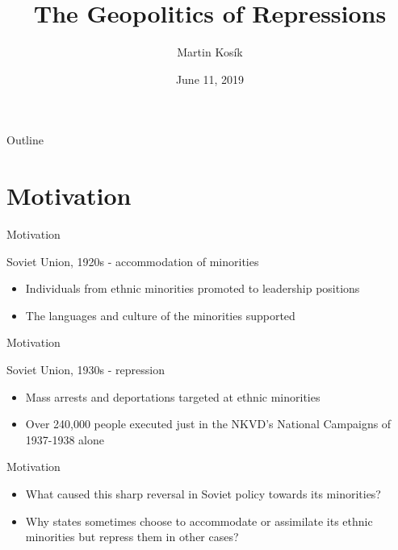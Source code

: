 \documentclass[11pt]{beamer}
\title{The Geopolitics of Repressions}
\date{June 11, 2019}
\author{Martin Kosík}
\institute{Charles University}
\begin{document}
\begin{frame}
\titlepage
\end{frame}
\begin{frame}{Outline}
\tableofcontents
\end{frame}


\section{Motivation}
\begin{frame}{Motivation}
 \begin{block}{Soviet Union, 1920s -  accommodation of minorities}  {
\begin{itemize}
    \item Individuals from ethnic minorities  promoted to leadership positions 
    \item  The languages and culture of the minorities supported \citep{martin_affirmative_2001}
\end{itemize}}
\end{block} 
\end{frame}

\begin{frame}{Motivation}
 \begin{block}{Soviet Union, 1930s - repression}  {
\begin{itemize}
    \item Mass arrests and deportations targeted at ethnic minorities
    \item  Over 240,000 people executed just in the NKVD's National Campaigns of 1937-1938 alone \citep[p. 855]{martin_origins_1998}
\end{itemize}}
\end{block} 

\end{frame}

\begin{frame}{Motivation}
\begin{itemize}
    \item What caused this sharp reversal in Soviet policy towards its minorities?
    \item Why states sometimes choose to accommodate or assimilate its ethnic minorities but repress them in other cases?
\end{itemize}

\end{frame}
\end{document}

